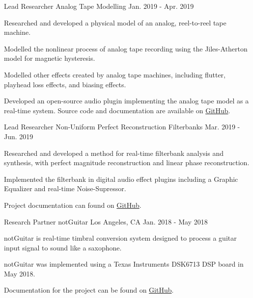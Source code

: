 \begin{cventries}
    \cventry
    {Lead Researcher} %
    {Analog Tape Modelling} %
    {} %
    {Jan. 2019 - Apr. 2019} %
    {
        \begin{cvitems}
              \item{Researched and developed a physical model of an analog, reel-to-reel tape machine.}
              \item{Modelled the nonlinear process of analog tape recording using the Jiles-Atherton model for magnetic hysteresis.}
              \item{Modelled other effects created by analog tape machines, including flutter, playhead loss effects, and biasing effects.}
              \item{Developed an open-source audio plugin implementing the analog tape model as a real-time system.
                    Source code and documentation are available on \href{https://github.com/jatinchowdhury18/AnalogTapeModel}{GitHub}.}
        \end{cvitems}
    }

    \cventry
    {Lead Researcher} %
    {Non-Uniform Perfect Reconstruction Filterbanks} %
    {} %
    {Mar. 2019 - Jun. 2019} %
    {
      \begin{cvitems} %
        \item {Researched and developed a method for real-time filterbank analysis and synthesis, with perfect magnitude reconstruction and linear phase reconstruction.}
        \item {Implemented the filterbank in digital audio effect plugins including a Graphic Equalizer and real-time Noise-Supressor.}
        \item {Project documentation can found on \href{https://github.com/jatinchowdhury18/NUPR-Filterbanks}{GitHub}.}
      \end{cvitems}
    }

    \cventry
    {Research Partner} %
    {notGuitar} %
    {Los Angeles, CA} %
    {Jan. 2018 - May 2018} %
    {
      \begin{cvitems} %
        \item {notGuitar is real-time timbral conversion system designed to process a guitar input signal to sound like a saxophone.}
        \item {notGuitar was implemented using a Texas Instruments DSK6713 DSP board in May 2018.}
        \item {Documentation for the project can be found on \href{https://github.com/jatinchowdhury18/notGuitar}{GitHub}.}
      \end{cvitems}
    }

\end{cventries}
